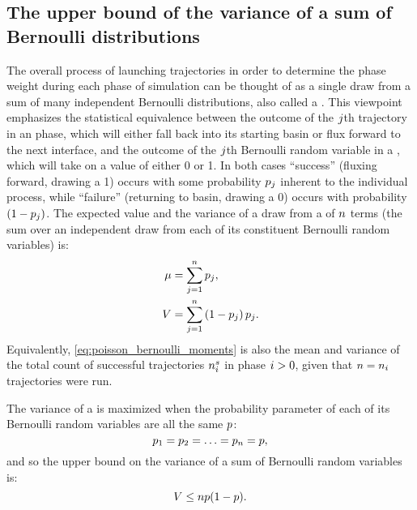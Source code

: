 %
%
%
%

\subsection{The upper bound of the variance of a sum of Bernoulli distributions}
\label{sec:bernoulli_mixture_var}
The overall process of launching trajectories in order to determine the phase weight during each phase of  simulation can be thought of as a single draw from a sum of many independent Bernoulli distributions, also called a . This viewpoint emphasizes the statistical equivalence between the outcome of the $j$th trajectory in an  phase, which will either fall back into its starting basin or flux forward to the next interface, and the outcome of the $j$th Bernoulli random variable in a , which will take on a value of either 0 or 1. In both cases ``success'' (fluxing forward, drawing a 1) occurs with some probability $p_{j}$ inherent to the individual process, while ``failure'' (returning to basin, drawing a 0) occurs with probability $(1 - p_{j})$. The expected value and the variance of a draw from a  of $n$ terms (\ie the sum over an independent draw from each of its constituent Bernoulli random variables) is:
    \begin{align}
    \label{eq:poisson_bernoulli_moments}
        \begin{split}
            \mu &= \sum _{j=1}^{n} p_{j}, \\
            V &= \sum _{j=1}^{n} \left( 1 - p_{j} \right) p_{j}.
        \end{split}
    \end{align}
Equivalently, \eqref{eq:poisson_bernoulli_moments} is also the mean and variance of the total count of successful trajectories $n_{i}^{s}$ in  phase $i>0$, given that $n = n_{i}$ trajectories were run.

The variance of a  is maximized when the probability parameter of each of its Bernoulli random variables are all the same $p$:
    \begin{equation*}
        p_{1} = p_{2} = \ldots = p_{n} = p,
    \end{equation*}
and so the upper bound on the variance of a sum of Bernoulli random variables is:
    \begin{equation}
    \label{eq:bernoulli_mixture_variance_max}
        V \leq n p(1 - p).
    \end{equation}

